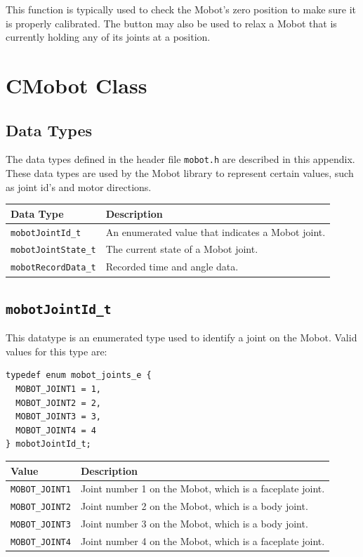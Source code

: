 \documentclass{article}
\begin{document}
This function is typically used to check the Mobot's zero position to make sure
it is properly calibrated. The button may also be used to relax a Mobot that
is currently holding any of its joints at a position.

\newpage
\appendix
\section{CMobot Class}
\subsection{\label{sec:datatypes}Data Types}
The data types defined in the header file \texttt{mobot.h} are described in
this appendix.
These data types are used by the Mobot library to represent 
certain values, such as joint id's and motor directions.

\begin{tabular}{p{3.5cm}p{10cm}} \hline 
Data Type& Description \\
\hline 
\texttt{mobotJointId\_t} & An enumerated value that indicates a Mobot joint. \\
\texttt{mobotJointState\_t} & The current state of a Mobot joint. \\
\texttt{mobotRecordData\_t} & Recorded time and angle data. \\
\hline
\end{tabular}

\subsection{\label{sec:mobotJointId_t}\texttt{mobotJointId\_t}}
This datatype is an enumerated type used to identify a joint on the Mobot. Valid
values for this type are:
\begin{verbatim}
typedef enum mobot_joints_e {
  MOBOT_JOINT1 = 1,
  MOBOT_JOINT2 = 2,
  MOBOT_JOINT3 = 3,
  MOBOT_JOINT4 = 4
} mobotJointId_t;
\end{verbatim}

\begin{tabular}{p{3cm}p{10cm}} \hline 
Value & Description \\
\hline 
\texttt{MOBOT\_JOINT1} & Joint number 1 on the Mobot, which is a faceplate joint. \\
\texttt{MOBOT\_JOINT2} & Joint number 2 on the Mobot, which is a body joint. \\
\texttt{MOBOT\_JOINT3} & Joint number 3 on the Mobot, which is a body joint. \\
\texttt{MOBOT\_JOINT4} & Joint number 4 on the Mobot, which is a faceplate joint. \\
\hline
\end{tabular}
\end{document}
